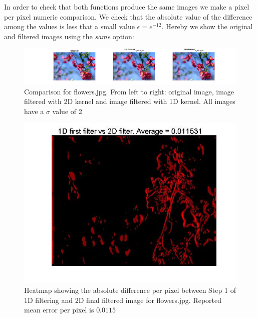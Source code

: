 \documentclass[11pt]{article}
\begin{document}
In order to check that both functions produce the same images we make a pixel
per pixel numeric comparison. We check that the absolute value of the difference among
the values is less that a small value $\epsilon = e^{-12}$. Hereby we show the
original and filtered images using the \emph{same} option:

\begin{figure}[H] \centering
	\includegraphics[width=1\textwidth]{imgs/flowers_conv.jpg}
	\caption{Comparison for flowers.jpg. From left to right: original image, image
	filtered with 2D kernel and image filtered with 1D kernel. All images have a
	$\sigma$ value of 2}
	\label{fig:flowers}
\end{figure}

\begin{figure}[H] \centering
	\includegraphics[width=.9\textwidth]{imgs/flowers_col_heatmap.jpg}
	\caption{Heatmap showing the absolute difference per pixel between Step
		1 of 1D filtering and 2D final filtered image for flowers.jpg. Reported
		mean error per pixel is $0.0115$}
	\label{fig:flowers_col_heatmap}
\end{figure}
\end{document}

